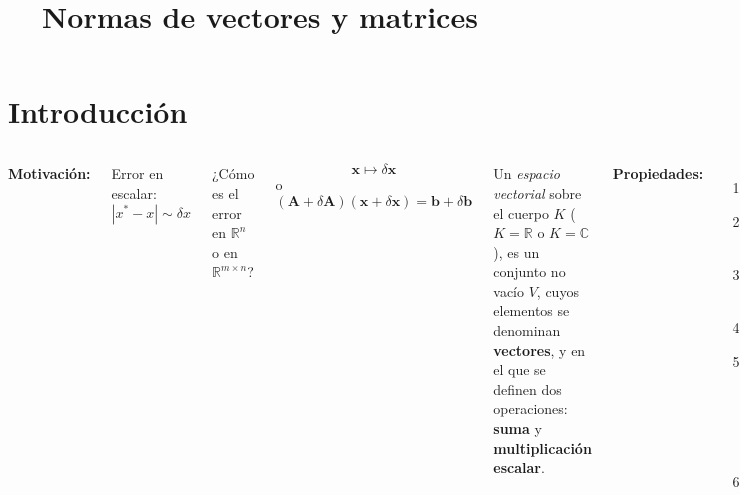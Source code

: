 \documentclass[9pt, aspectratio=169]{beamer}
\title{Normas de vectores y matrices}
\subtitle{}
\begin{document}
    \maketitle

    \section{Introducción}

    \begin{frame}
    \begin{columns}[t]
    \cx
    \textbf{Motivación:}

    Error en escalar:
    \[ |x^* - x| \sim \delta x \]

    ¿Cómo es el error en $\mathbb{R}^n$ o en $\mathbb{R}^{m \times n}$?

    \[ \bm{x} \mapsto \delta \bm{x} \]
    o
    \[ (\bm{A} + \delta \bm{A})(\bm{x} + \delta \bm{x}) = \bm{b} + \delta \bm{b} \]
    \pause

    \begin{definition}
    Un \textit{espacio vectorial} sobre el cuerpo $K$ ($K = \mathbb{R}$ o $K = \mathbb{C}$), es un conjunto no vacío $V$, cuyos elementos se denominan \textbf{vectores}, y en el que se definen dos operaciones: \textbf{suma} y \textbf{multiplicación escalar}.
    \end{definition} \pause

    \cx
    \textbf{Propiedades:}
    \begin{enumerate}
        \item La suma es conmutativa y asociativa.
        \item $\exists\; \bm{0} \in V$ (vector cero o nulo) tal que $\bm{v} + \bm{0} = \bm{v}, \; \forall \bm{v} \in V$.
        \item $0 \cdot \bm{v} = \bm{0}, 1 \cdot \bm{v} = \bm{v}$, donde $0$ y $1$ son respectivamente el cero y uno de $K$.
        \item $\forall \bm{v} \in V, \exists -\bm{v} \in V : \bm{v} + (-\bm{v}) = \bm{0}$.
        \item Propiedad distributiva:
            \begin{itemize}
            \item $\forall \alpha \in K, \forall \bm{v}, \bm{w} \in V, \alpha(\bm{v} + \bm{w}) = \alpha \bm{v} + \alpha \bm{w}$.
            \item $\forall \alpha, \beta \in K, \forall \bm{v} \in V, (\alpha + \beta) \bm{v} = \alpha \bm{v} + \beta \bm{v}$.
            \end{itemize}
        \item Propiedad asociativa:
            \begin{itemize}
                \item $\forall \alpha, \beta \in K, \forall \bm{v} \in V, (\alpha \beta)\bm{v} = \alpha (\beta \bm{v})$
            \end{itemize}
    \end{enumerate} \pause


\end{columns}
\end{frame}
\end{document}
